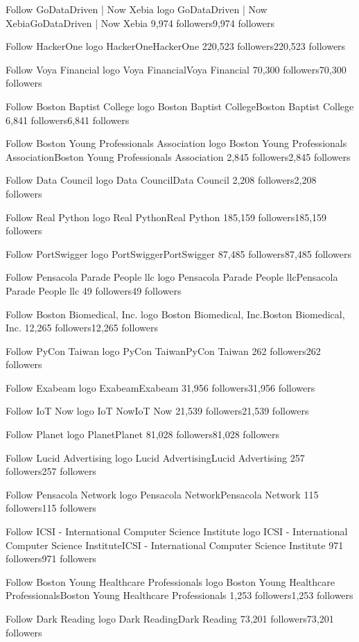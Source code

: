 Follow
GoDataDriven | Now Xebia logo
GoDataDriven | Now XebiaGoDataDriven | Now Xebia
9,974 followers9,974 followers

Follow
HackerOne logo
HackerOneHackerOne
220,523 followers220,523 followers

Follow
Voya Financial logo
Voya FinancialVoya Financial
70,300 followers70,300 followers

Follow
Boston Baptist College logo
Boston Baptist CollegeBoston Baptist College
6,841 followers6,841 followers

Follow
Boston Young Professionals Association logo
Boston Young Professionals AssociationBoston Young Professionals Association
2,845 followers2,845 followers

Follow
Data Council logo
Data CouncilData Council
2,208 followers2,208 followers

Follow
Real Python logo
Real PythonReal Python
185,159 followers185,159 followers

Follow
PortSwigger logo
PortSwiggerPortSwigger
87,485 followers87,485 followers

Follow
Pensacola Parade People llc logo
Pensacola Parade People llcPensacola Parade People llc
49 followers49 followers

Follow
Boston Biomedical, Inc. logo
Boston Biomedical, Inc.Boston Biomedical, Inc.
12,265 followers12,265 followers

Follow
PyCon Taiwan logo
PyCon TaiwanPyCon Taiwan
262 followers262 followers

Follow
Exabeam logo
ExabeamExabeam
31,956 followers31,956 followers

Follow
IoT Now logo
IoT NowIoT Now
21,539 followers21,539 followers

Follow
Planet logo
PlanetPlanet
81,028 followers81,028 followers

Follow
Lucid Advertising logo
Lucid AdvertisingLucid Advertising
257 followers257 followers

Follow
Pensacola Network logo
Pensacola NetworkPensacola Network
115 followers115 followers

Follow
ICSI - International Computer Science Institute logo
ICSI - International Computer Science InstituteICSI - International Computer Science Institute
971 followers971 followers

Follow
Boston Young Healthcare Professionals logo
Boston Young Healthcare ProfessionalsBoston Young Healthcare Professionals
1,253 followers1,253 followers

Follow
Dark Reading logo
Dark ReadingDark Reading
73,201 followers73,201 followers

